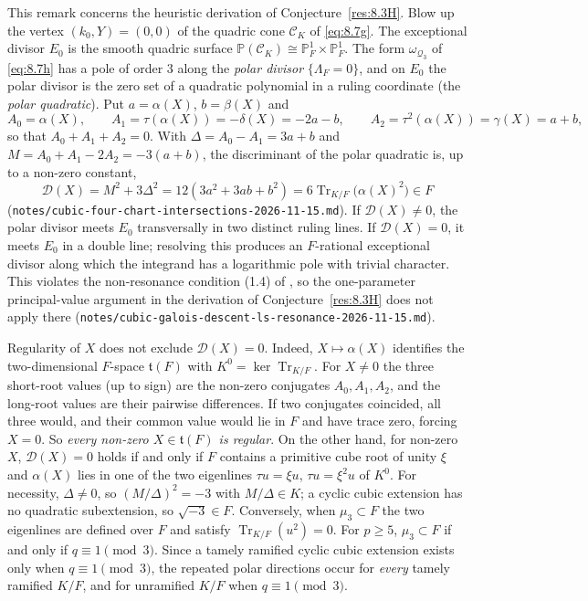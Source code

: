 \documentclass[12pt,letterpaper]{amsart}
\theoremstyle{plain}
\theoremstyle{definition}
\theoremstyle{remark}
\theoremstyle{definition}
\begin{document}
\begin{rem26}\label{rem:8.polar-regular}
This remark concerns the heuristic derivation of Conjecture~\ref{res:8.3H}. Blow up the
vertex $(k_0,Y)=(0,0)$ of the quadric cone $\mathcal C_K$ of \eqref{eq:8.7g}.
The exceptional divisor $E_0$ is the smooth quadric surface
$\mathbb P(\mathcal C_K)\cong\mathbb P^1_F\times\mathbb P^1_F$. The form
$\omega_{\mathcal Q_3}$ of \eqref{eq:8.7h} has a pole of order $3$ along the
\emph{polar divisor} $\{\Lambda_F=0\}$, and on $E_0$ the polar divisor is the
zero set of a quadratic polynomial in a ruling coordinate (the \emph{polar
quadratic}). Put $a=\alpha(X)$, $b=\beta(X)$ and
\[
 A_0=\alpha(X),\qquad A_1=\tau(\alpha(X))=-\delta(X)=-2a-b,
 \qquad A_2=\tau^2(\alpha(X))=\gamma(X)=a+b,
\]
so that $A_0+A_1+A_2=0$. With $\Delta=A_0-A_1=3a+b$ and
$M=A_0+A_1-2A_2=-3(a+b)$, the discriminant of the polar quadratic is, up to a
non-zero constant,
\begin{equation}\tag{8.7i}\label{eq:8.polar-discriminant}
 \mathscr D(X)=M^2+3\Delta^2
 =12(3a^2+3ab+b^2)
 =6\operatorname{Tr}_{K/F}\bigl(\alpha(X)^2\bigr)\in F
\end{equation}
(\texttt{notes/cubic-four-chart-intersections-2026-11-15.md}). If
$\mathscr D(X)\neq0$, the polar divisor meets $E_0$ transversally in two
distinct ruling lines. If $\mathscr D(X)=0$, it meets $E_0$ in a double line;
resolving this produces an $F$-rational exceptional divisor along which the
integrand has a logarithmic pole with trivial character. This violates the
non-resonance condition (1.4) of \cite{LS83}, so the one-parameter
principal-value argument in the derivation of Conjecture~\ref{res:8.3H} does not apply
there (\texttt{notes/cubic-galois-descent-ls-resonance-2026-11-15.md}).

Regularity of $X$ does not exclude $\mathscr D(X)=0$. Indeed,
$X\mapsto\alpha(X)$ identifies the two-dimensional $F$-space $\mathfrak t(F)$
with $K^0=\ker\operatorname{Tr}_{K/F}$. For $X\ne0$ the three short-root values
(up to sign) are the non-zero conjugates $A_0,A_1,A_2$, and the long-root values
are their pairwise differences. If two conjugates coincided, all three would,
and their common value would lie in $F$ and have trace zero, forcing $X=0$. So
\emph{every non-zero $X\in\mathfrak t(F)$ is regular}. On the other hand, for
non-zero $X$, $\mathscr D(X)=0$ holds if and only if $F$ contains a primitive
cube root of unity $\xi$ and $\alpha(X)$ lies in one of the two eigenlines
$\tau u=\xi u$, $\tau u=\xi^2u$ of $K^0$. For necessity, $\Delta\ne0$, so
$(M/\Delta)^2=-3$ with $M/\Delta\in K$; a cyclic cubic extension has no
quadratic subextension, so $\sqrt{-3}\in F$. Conversely, when $\mu_3\subset F$
the two eigenlines are defined over $F$ and satisfy
$\operatorname{Tr}_{K/F}(u^2)=0$. For $p\ge5$, $\mu_3\subset F$ if and only if
$q\equiv1\pmod3$. Since a tamely ramified cyclic cubic extension exists only
when $q\equiv1\pmod 3$, the repeated polar directions occur for \emph{every}
tamely ramified $K/F$, and for unramified $K/F$ when $q\equiv1\pmod3$.


\end{rem26}
\end{document}
